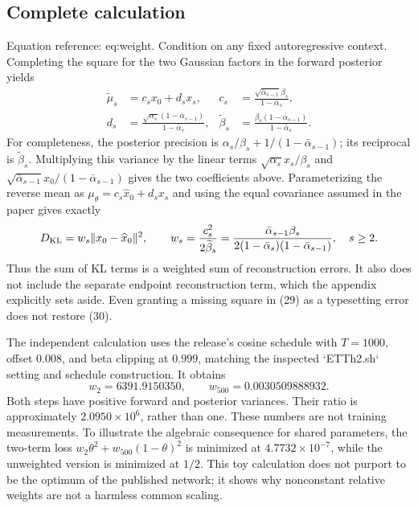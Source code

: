 \documentclass[10pt]{article}
\begin{document}
\subsection*{Complete calculation}
Equation reference: eq:weight. Condition on any fixed autoregressive context. Completing the square for the two Gaussian factors in the forward posterior yields \[\begin{aligned}
 \widetilde\mu_s&=c_s x_0+d_s x_s,&
 c_s&=\frac{\sqrt{\bar\alpha_{s-1}}\beta_s}{1-\bar\alpha_s},\\
 d_s&=\frac{\sqrt{\alpha_s}(1-\bar\alpha_{s-1})}{1-\bar\alpha_s},&
 \widetilde\beta_s&=\frac{\beta_s(1-\bar\alpha_{s-1})}{1-\bar\alpha_s}.\end{aligned}\] For completeness, the posterior precision is \(\alpha_s/\beta_s+1/(1-\bar\alpha_{s-1})\); its reciprocal is \(\widetilde\beta_s\). Multiplying this variance by the linear terms \(\sqrt{\alpha_s}x_s/\beta_s\) and \(\sqrt{\bar\alpha_{s-1}}x_0/(1-\bar\alpha_{s-1})\) gives the two coefficients above. Parameterizing the reverse mean as \(\mu_\theta=c_s\widehat x_0+d_s x_s\) and using the equal covariance assumed in the paper gives exactly \[
 D_{\rm KL}=w_s\|x_0-\widehat x_0\|^2,\qquad
 w_s=\frac{c_s^2}{2\widetilde\beta_s}
 =\frac{\bar\alpha_{s-1}\beta_s}
 {2(1-\bar\alpha_s)(1-\bar\alpha_{s-1})},\quad s\ge2.\] Thus the sum of KL terms is a weighted sum of reconstruction errors. It also does not include the separate endpoint reconstruction term, which the appendix explicitly sets aside. Even granting a missing square in (29) as a typesetting error does not restore (30).\par
The independent calculation uses the release’s cosine schedule with \(T=1000\), offset \(0.008\), and beta clipping at \(0.999\), matching the inspected `ETTh2.sh` setting and schedule construction. It obtains \[w_2=6391.9150350,\qquad w_{500}=0.0030509888932.\] Both steps have positive forward and posterior variances. Their ratio is approximately \(2.0950\times10^6\), rather than one. These numbers are not training measurements. To illustrate the algebraic consequence for shared parameters, the two-term loss \(w_2\theta^2+w_{500}(1-\theta)^2\) is minimized at \(4.7732\times10^{-7}\), while the unweighted version is minimized at \(1/2\). This toy calculation does not purport to be the optimum of the published network; it shows why nonconstant relative weights are not a harmless common scaling.\par
\end{document}
